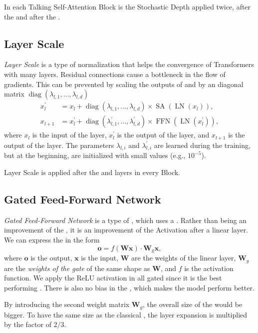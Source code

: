In each Talking Self-Attention Block is the Stochastic Depth applied twice, after the \MHSA and after the \FFN.

\subsection{Layer Scale}
\label{sec:layer_scale}
\emph{Layer Scale} \cite{cait} is a type of normalization that helps the convergence of Transformers with many layers. 
Residual connections cause a bottleneck in the flow of gradients.
This can be prevented by scaling the outputs of \SA and \FFN by an diagonal matrix $\operatorname{diag}\left(\lambda_{l, 1}, \ldots, \lambda_{l, d}\right)$
\begin{equation}
\begin{aligned}
    x_l^{\prime} & =x_l+\operatorname{diag}\left(\lambda_{l, 1}, \ldots, \lambda_{l, d}\right) \times \operatorname{SA}\left(\operatorname{LN}\left(x_l\right)\right), \\
    x_{l+1} & =x_l^{\prime}+\operatorname{diag}\left(\lambda_{l, 1}^{\prime}, \ldots, \lambda_{l, d}^{\prime}\right) \times \operatorname{FFN}\left(\operatorname{LN}\left(x_l^{\prime}\right)\right),
\end{aligned}
\end{equation}
where $x_l$ is the input of the layer, $x_l^{\prime}$ is the output of the \SA layer, and $x_{l+1}$ is the output of the \FFN layer.
The parameters $\lambda_{l, i}$ and $\lambda_{l, i}^{\prime}$ are learned during the training, but at the beginning, are initialized with small values (e.g., $10^{-5}$).

Layer Scale is applied after the \SA and \FFN layers in every \SA Block.

\subsection{Gated Feed-Forward Network}
\label{sec:gated_ffn}
\emph{Gated Feed-Forward Network} is a type of \FFN, which uses a \GLU \cite{GLU}.
Rather than being an improvement of the \FFN, it is an improvement of the Activation after a linear layer.
We can express the \GLU in the form
\begin{equation}
    \pmb{o} = f(\pmb{W} \pmb{x}) \cdot \pmb{W}_{\text{g}} \pmb{x},
\end{equation}
where $\pmb{o}$ is the output, $\pmb{x}$ is the input, $\pmb{W}$ are the weights of the linear layer, $\pmb{W}_g$ are the \emph{weights of the gate} of the same shape as $\pmb{W}$, and $f$ is the activation function.
We apply the ReLU activation in all gated \FFN since it is the best performing \cite{GLU}.
There is also no bias in the \GLU, which makes the model perform better.

By introducing the second weight matrix $\pmb{W}_g$, the overall size of the \FFN would be bigger.
To have the same size as the classical \FFN, the layer expansion is multiplied by the factor of $2/3$.


